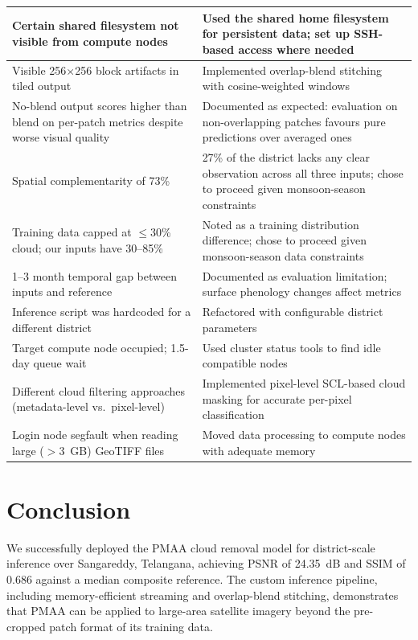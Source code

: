 \documentclass[12pt,a4paper]{article}
\begin{document}
\begin{longtable}{p{}p{}}
\midrule
Certain shared filesystem not visible from compute nodes & Used the shared home filesystem for persistent data; set up SSH-based access where needed \\
\midrule
Visible 256$\times$256 block artifacts in tiled output & Implemented overlap-blend stitching with cosine-weighted windows \\
\midrule
No-blend output scores higher than blend on per-patch metrics despite worse visual quality & Documented as expected: evaluation on non-overlapping patches favours pure predictions over averaged ones \\
\midrule
Spatial complementarity of 73\% & 27\% of the district lacks any clear observation across all three inputs; chose to proceed given monsoon-season constraints \\
\midrule
Training data capped at $\leq$30\% cloud; our inputs have 30--85\% & Noted as a training distribution difference; chose to proceed given monsoon-season data constraints \\
\midrule
1--3 month temporal gap between inputs and reference & Documented as evaluation limitation; surface phenology changes affect metrics \\
\midrule
Inference script was hardcoded for a different district & Refactored with configurable district parameters \\
\midrule
Target compute node occupied; 1.5-day queue wait & Used cluster status tools to find idle compatible nodes \\
\midrule
Different cloud filtering approaches (metadata-level vs.\ pixel-level) & Implemented pixel-level SCL-based cloud masking for accurate per-pixel classification \\
\midrule
Login node segfault when reading large ($>$3~GB) GeoTIFF files & Moved data processing to compute nodes with adequate memory \\

\end{longtable}



\section{Conclusion}

We successfully deployed the PMAA cloud removal model for district-scale inference over Sangareddy, Telangana, achieving PSNR of 24.35~dB and SSIM of 0.686 against a median composite reference. The custom inference pipeline, including memory-efficient streaming and overlap-blend stitching, demonstrates that PMAA can be applied to large-area satellite imagery beyond the pre-cropped patch format of its training data.
\end{document}
